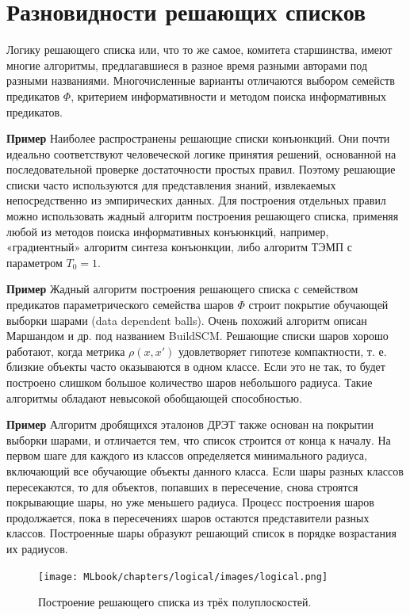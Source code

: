 \section{Разновидности решающих списков}

Логику решающего списка или, что то же самое, комитета старшинства, имеют многие алгоритмы, предлагавшиеся в разное время разными авторами под разными названиями. Многочисленные варианты отличаются выбором семейств предикатов $\Phi$, критерием информативности и методом поиска информативных предикатов.

\textbf{Пример} Наиболее распространены решающие списки конъюнкций. Они почти идеально соответствуют человеческой логике принятия решений, основанной на последовательной проверке достаточности простых правил. Поэтому решающие списки часто используются для представления знаний, извлекаемых непосредственно из эмпирических данных. Для построения отдельных правил можно использовать жадный алгоритм построения решающего списка, применяя любой из методов поиска информативных конъюнкций, например, «градиентный» алгоритм синтеза конъюнкции, либо алгоритм ТЭМП с параметром $T_0 = 1$.

\textbf{Пример} Жадный алгоритм построения решающего списка с семейством предикатов параметрического семейства шаров $\Phi$ строит покрытие обучающей выборки шарами (data dependent balls). Очень похожий алгоритм описан Маршандом и др. под названием BuildSCM. Решающие списки шаров хорошо работают, когда метрика $\rho(x, x')$ удовлетворяет гипотезе компактности, т. е. близкие объекты часто оказываются в одном классе. Если это не так, то будет построено слишком большое количество шаров небольшого радиуса. Такие алгоритмы обладают невысокой обобщающей способностью.

\textbf{Пример} Алгоритм дробящихся эталонов ДРЭТ также основан на покрытии выборки шарами, и отличается тем, что список строится от конца к началу. На первом шаге для каждого из классов определяется минимального радиуса, включающий все обучающие объекты данного класса. Если шары разных классов
пересекаются, то для объектов, попавших в пересечение, снова строятся покрывающие шары, но уже меньшего радиуса. Процесс построения шаров продолжается, пока в пересечениях шаров остаются представители разных классов. Построенные шары образуют решающий список в порядке возрастания их радиусов.

\begin{figure}[h!] \centering \texttt{[image: MLbook/chapters/logical/images/logical.png]} \caption{Построение решающего списка из трёх полуплоскостей.} \end{figure}

